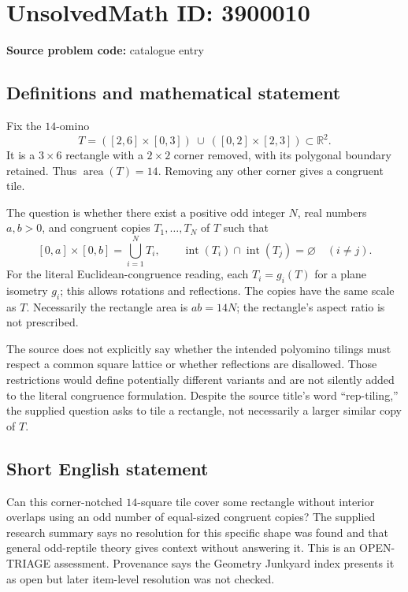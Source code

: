 \documentclass[11pt]{article}
\newcommand{\R}{\mathbb{R}}
\begin{document}
\section*{UnsolvedMath ID: 3900010}
\textbf{Source problem code:} catalogue entry
\subsection{Definitions and mathematical statement}
Fix the $14$-omino
\[
 T=([2,6]\times[0,3])\ \cup\ ([0,2]\times[2,3])\subset\R^2.
\]
It is a $3\times6$ rectangle with a $2\times2$ corner removed, with its polygonal boundary retained. Thus $\operatorname{area}(T)=14$. Removing any other corner gives a congruent tile.

The question is whether there exist a positive odd integer $N$, real numbers $a,b>0$, and congruent copies $T_1,\ldots,T_N$ of $T$ such that
\[
 [0,a]\times[0,b]=\bigcup_{i=1}^N T_i,
 \qquad \operatorname{int}(T_i)\cap\operatorname{int}(T_j)=\varnothing
 \quad(i\ne j).
\]
For the literal Euclidean-congruence reading, each $T_i=g_i(T)$ for a plane isometry $g_i$; this allows rotations and reflections. The copies have the same scale as $T$. Necessarily the rectangle area is $ab=14N$; the rectangle's aspect ratio is not prescribed.

The source does not explicitly say whether the intended polyomino tilings must respect a common square lattice or whether reflections are disallowed. Those restrictions would define potentially different variants and are not silently added to the literal congruence formulation. Despite the source title's word ``rep-tiling,'' the supplied question asks to tile a rectangle, not necessarily a larger similar copy of $T$.
\subsection{Short English statement}
Can this corner-notched $14$-square tile cover some rectangle without interior overlaps using an odd number of equal-sized congruent copies? The supplied research summary says no resolution for this specific shape was found and that general odd-reptile theory gives context without answering it. This is an OPEN-TRIAGE assessment. Provenance says the Geometry Junkyard index presents it as open but later item-level resolution was not checked.
\end{document}
